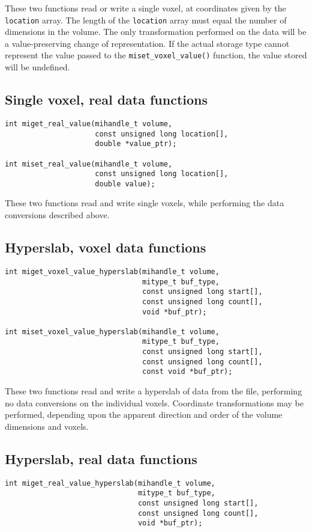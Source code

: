 \documentclass{article}
\begin{document}
These two functions read or write a single voxel, at coordinates given
by the {\tt location} array.  The length of the {\tt location} array must
equal the number of dimensions in the volume.  The only transformation
performed on the data will be a value-preserving change of representation.
If the actual storage type cannot represent the value passed to the 
{\tt miset\_voxel\_value()} function, the value stored will be undefined.

\subsection{Single voxel, real data functions}
\begin{verbatim}
int miget_real_value(mihandle_t volume,
                     const unsigned long location[],
                     double *value_ptr);

int miset_real_value(mihandle_t volume,
                     const unsigned long location[],
                     double value);
\end{verbatim}

These two functions read and write single voxels, while performing the data
conversions described above.

\subsection{Hyperslab, voxel data functions}
\begin{verbatim}
int miget_voxel_value_hyperslab(mihandle_t volume,
                                mitype_t buf_type,
                                const unsigned long start[],
                                const unsigned long count[],
                                void *buf_ptr);

int miset_voxel_value_hyperslab(mihandle_t volume, 
                                mitype_t buf_type,
                                const unsigned long start[],
                                const unsigned long count[],
                                const void *buf_ptr);
\end{verbatim}

These two functions read and write a hyperslab of data from the file, 
performing no data conversions on the individual voxels.  Coordinate
transformations may be performed, depending upon the apparent direction
and order of the volume dimensions and voxels.

\subsection{Hyperslab, real data functions}
\begin{verbatim}
int miget_real_value_hyperslab(mihandle_t volume,
                               mitype_t buf_type,
                               const unsigned long start[],
                               const unsigned long count[],
                               void *buf_ptr);
\end{verbatim}
\end{document}
